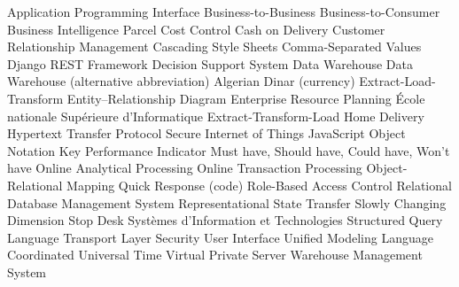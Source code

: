 
\begin{acronym}[OR-Tools]   %
                  {Application Programming Interface}
                  {Business-to-Business}
                  {Business-to-Consumer}
                   {Business Intelligence}
                  {Parcel Cost Control}
                  {Cash on Delivery}
                  {Customer Relationship Management}
                  {Cascading Style Sheets}
                  {Comma-Separated Values}
                  {Django REST Framework}
                  {Decision Support System}
                   {Data Warehouse}
                  {Data Warehouse (alternative abbreviation)}
                  {Algerian Dinar (currency)}
                  {Extract-Load-Transform}
                  {Entity--Relationship Diagram}
                  {Enterprise Resource Planning}
                  {École nationale Supérieure d'Informatique}
                  {Extract-Transform-Load}
                   {Home Delivery}
                {Hypertext Transfer Protocol Secure}
                  {Internet of Things}
                 {JavaScript Object Notation}
                  {Key Performance Indicator}
               {Must have, Should have, Could have, Won't have}
                 {Online Analytical Processing}
                 {Online Transaction Processing}
                  {Object-Relational Mapping}
                   {Quick Response (code)}
                 {Role-Based Access Control}
                {Relational Database Management System}
                 {Representational State Transfer}
                  {Slowly Changing Dimension}
                   {Stop Desk}
                  {Systèmes d'Information et Technologies}
                  {Structured Query Language}
                  {Transport Layer Security}
                   {User Interface}
                  {Unified Modeling Language}
                  {Coordinated Universal Time}
                  {Virtual Private Server}
                  {Warehouse Management System}
\end{acronym}